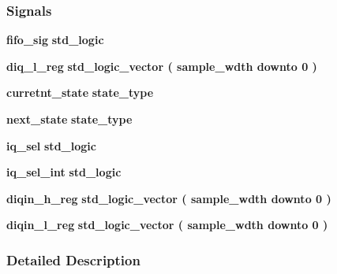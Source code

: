 \subsubsection*{Signals}
 \begin{DoxyCompactItemize}
\item 
{\bf fifo\+\_\+sig} {\bfseries \textcolor{comment}{std\+\_\+logic}\textcolor{vhdlchar}{ }} 
\item 
{\bf diq\+\_\+l\+\_\+reg} {\bfseries \textcolor{comment}{std\+\_\+logic\+\_\+vector}\textcolor{vhdlchar}{ }\textcolor{vhdlchar}{(}\textcolor{vhdlchar}{ }\textcolor{vhdlchar}{ }\textcolor{vhdlchar}{ }\textcolor{vhdlchar}{ }{\bfseries {\bf sample\+\_\+wdth}} \textcolor{vhdlchar}{ }\textcolor{keywordflow}{downto}\textcolor{vhdlchar}{ }\textcolor{vhdlchar}{ } \textcolor{vhdldigit}{0} \textcolor{vhdlchar}{ }\textcolor{vhdlchar}{)}\textcolor{vhdlchar}{ }} 
\item 
{\bf curretnt\+\_\+state} {\bfseries {\bfseries {\bf state\+\_\+type}} \textcolor{vhdlchar}{ }} 
\item 
{\bf next\+\_\+state} {\bfseries {\bfseries {\bf state\+\_\+type}} \textcolor{vhdlchar}{ }} 
\item 
{\bf iq\+\_\+sel} {\bfseries \textcolor{comment}{std\+\_\+logic}\textcolor{vhdlchar}{ }} 
\item 
{\bf iq\+\_\+sel\+\_\+int} {\bfseries \textcolor{comment}{std\+\_\+logic}\textcolor{vhdlchar}{ }} 
\item 
{\bf diqin\+\_\+h\+\_\+reg} {\bfseries \textcolor{comment}{std\+\_\+logic\+\_\+vector}\textcolor{vhdlchar}{ }\textcolor{vhdlchar}{(}\textcolor{vhdlchar}{ }\textcolor{vhdlchar}{ }\textcolor{vhdlchar}{ }\textcolor{vhdlchar}{ }{\bfseries {\bf sample\+\_\+wdth}} \textcolor{vhdlchar}{ }\textcolor{keywordflow}{downto}\textcolor{vhdlchar}{ }\textcolor{vhdlchar}{ } \textcolor{vhdldigit}{0} \textcolor{vhdlchar}{ }\textcolor{vhdlchar}{)}\textcolor{vhdlchar}{ }} 
\item 
{\bf diqin\+\_\+l\+\_\+reg} {\bfseries \textcolor{comment}{std\+\_\+logic\+\_\+vector}\textcolor{vhdlchar}{ }\textcolor{vhdlchar}{(}\textcolor{vhdlchar}{ }\textcolor{vhdlchar}{ }\textcolor{vhdlchar}{ }\textcolor{vhdlchar}{ }{\bfseries {\bf sample\+\_\+wdth}} \textcolor{vhdlchar}{ }\textcolor{keywordflow}{downto}\textcolor{vhdlchar}{ }\textcolor{vhdlchar}{ } \textcolor{vhdldigit}{0} \textcolor{vhdlchar}{ }\textcolor{vhdlchar}{)}\textcolor{vhdlchar}{ }} 
\end{DoxyCompactItemize}


\subsubsection{Detailed Description}


